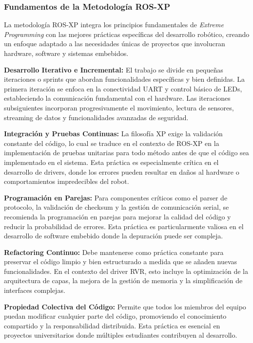 \documentclass[11pt]{article}
\numberwithin{figure}{section}
\numberwithin{table}{section}
\begin{document}
\subsubsection{Fundamentos de la Metodología ROS-XP}

La metodología ROS-XP integra los principios fundamentales de \textit{Extreme Programming} con las mejores prácticas específicas del desarrollo robótico, creando un enfoque adaptado a las necesidades únicas de proyectos que involucran hardware, software y sistemas embebidos.

\textbf{Desarrollo Iterativo e Incremental:} El trabajo se divide en pequeñas iteraciones o sprints que abordan funcionalidades específicas y bien definidas. La primera iteración se enfoca en la conectividad UART y control básico de LEDs, estableciendo la comunicación fundamental con el hardware. Las iteraciones subsiguientes incorporan progresivamente el movimiento, lectura de sensores, streaming de datos y funcionalidades avanzadas de seguridad.

\textbf{Integración y Pruebas Continuas:} La filosofía XP exige la validación constante del código, lo cual se traduce en el contexto de ROS-XP en la implementación de pruebas unitarias para todo método antes de que el código sea implementado en el sistema. Esta práctica es especialmente crítica en el desarrollo de drivers, donde los errores pueden resultar en daños al hardware o comportamientos impredecibles del robot.

\textbf{Programación en Parejas:} Para componentes críticos como el parser de protocolo, la validación de checksum y la gestión de comunicación serial, se recomienda la programación en parejas para mejorar la calidad del código y reducir la probabilidad de errores. Esta práctica es particularmente valiosa en el desarrollo de software embebido donde la depuración puede ser compleja.

\textbf{Refactoring Continuo:} Debe mantenerse como práctica constante para preservar el código limpio y bien estructurado a medida que se añaden nuevas funcionalidades. En el contexto del driver RVR, esto incluye la optimización de la arquitectura de capas, la mejora de la gestión de memoria y la simplificación de interfaces complejas.

\textbf{Propiedad Colectiva del Código:} Permite que todos los miembros del equipo puedan modificar cualquier parte del código, promoviendo el conocimiento compartido y la responsabilidad distribuida. Esta práctica es esencial en proyectos universitarios donde múltiples estudiantes contribuyen al desarrollo.
\end{document}
